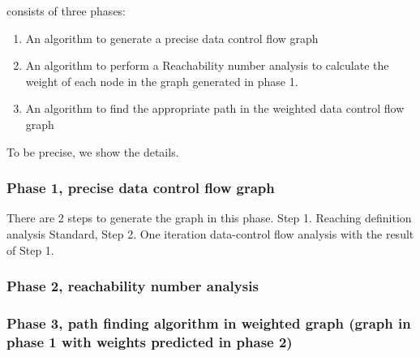 
{\THESYSTEM} consists of three phases: 
\begin{enumerate}
    \item An algorithm to generate a precise data control flow graph
    \item An algorithm to perform a Reachability number analysis to calculate the weight of each node in the graph generated in phase 1.
    \item An algorithm to find the appropriate path in the weighted data control flow graph
\end{enumerate}

To be precise, we show the details. 
\subsubsection{Phase 1, precise data control flow graph}
There are 2 steps to generate the graph in this phase.
Step 1. Reaching definition analysis
   Standard, 
Step 2. One iteration data-control flow analysis with the result of Step 1.

\subsubsection{Phase 2, reachability number analysis}

\subsubsection{Phase 3, path finding algorithm in weighted graph (graph in phase 1 with weights predicted in phase 2) }